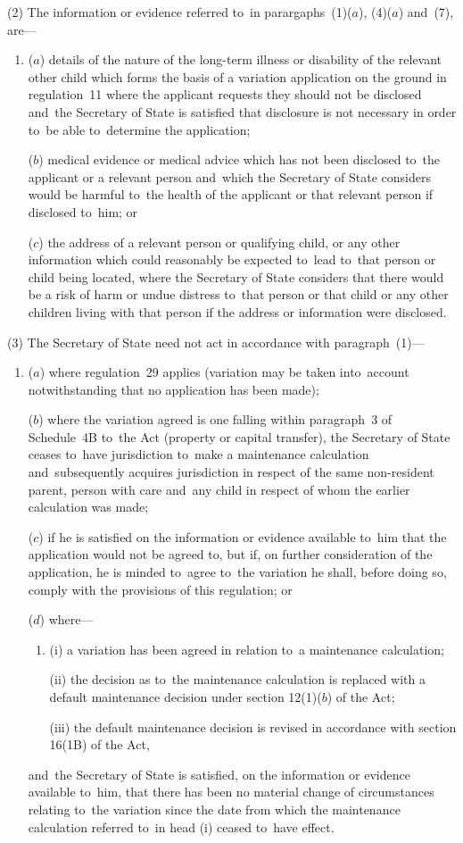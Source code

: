 \documentclass[12pt,a4paper]{article}
\begin{document}
(2) The information or evidence referred to~in parargaphs~(1)($a$), (4)($a$)  and~(7), are—
\begin{enumerate}\item[]
($a$) details of the nature of the long-term illness or disability of the relevant other child which forms the basis of a variation application on the ground in regulation~11 where the applicant requests they should not be disclosed and~the Secretary of State is satisfied that disclosure is not necessary in order to~be able to~determine the application;

($b$) medical evidence or medical advice which has not been disclosed to~the applicant or a relevant person and~which the Secretary of State considers would be harmful to~the health of the applicant or that relevant person if disclosed to~him; or

($c$) the address of a relevant person or qualifying child, or any other information which could reasonably be expected to~lead to~that person or child being located, where the Secretary of State considers that there would be a risk of harm or undue distress to~that person or that child or any other children living with that person if the address or information were disclosed.
\end{enumerate}

(3) The Secretary of State need not act in accordance with paragraph~(1)—
\begin{enumerate}\item[]
($a$) where regulation~29 applies (variation may be taken into~account notwithstanding that no application has been made);

($b$) where the variation agreed is one falling within paragraph~3 of Schedule~4B to~the Act (property or capital transfer), the Secretary of State ceases to~have jurisdiction to~make a maintenance calculation and~subsequently acquires jurisdiction in respect of the same non-resident parent, person with care and~any child in respect of whom the earlier calculation was made;

($c$) if he is satisfied on the information or evidence available to~him that the application would not be agreed to, but if, on further consideration of the application, he is minded to~agree to~the variation he shall, before doing so, comply with the provisions of this regulation; or

($d$) where—
\begin{enumerate}\item[]
(i) a variation has been agreed in relation to~a maintenance calculation;

(ii) the decision as to~the maintenance calculation is replaced with a default maintenance decision under section 12(1)($b$)  of the Act;

(iii) the default maintenance decision is revised in accordance with section 16(1B) of the Act,
\end{enumerate}
and~the Secretary of State is satisfied, on the information or evidence available to~him, that there has been no material change of circumstances relating to~the variation since the date from which the maintenance calculation referred to~in head (i)  ceased to~have effect.
\end{enumerate}
\end{document}
